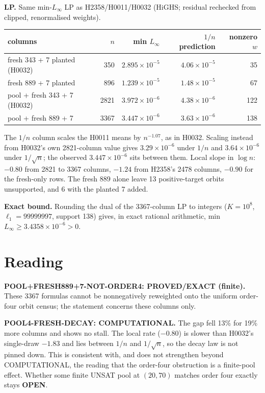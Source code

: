 \documentclass[11pt]{article}
\begin{document}
\textbf{LP.} Same min-$L_\infty$ LP as H2358/H0011/H0032 (HiGHS; residual rechecked from clipped, renormalised weights).
\begin{center}\begin{tabular}{lrrrr}\toprule
columns & $n$ & min $L_\infty$ & $1/n$ prediction & nonzero $w$\\\midrule
fresh 343 + 7 planted (H0032) & 350 & $2.895\times10^{-5}$ & $4.06\times10^{-5}$ & 35\\
fresh 889 + 7 planted & 896 & $1.239\times10^{-5}$ & $1.48\times10^{-5}$ & 67\\
pool + fresh 343 + 7 (H0032) & 2821 & $3.972\times10^{-6}$ & $4.38\times10^{-6}$ & 122\\
pool + fresh 889 + 7 & 3367 & $3.447\times10^{-6}$ & $3.63\times10^{-6}$ & 138\\\bottomrule
\end{tabular}\end{center}
The $1/n$ column scales the H0011 means by $n^{-1.07}$, as in H0032. Scaling instead from H0032's own 2821-column value gives $3.29\times10^{-6}$ under $1/n$ and $3.64\times10^{-6}$ under $1/\sqrt n$; the observed $3.447\times10^{-6}$ sits between them. Local slope in $\log n$: $-0.80$ from 2821 to 3367 columns, $-1.24$ from H2358's 2478 columns, $-0.90$ for the fresh-only rows. The fresh 889 alone leave 13 positive-target orbits unsupported, and 6 with the planted 7 added.

\textbf{Exact bound.} Rounding the dual of the 3367-column LP to integers ($K=10^8$, $\ell_1=99999997$, support 138) gives, in exact rational arithmetic, min $L_\infty\ge3.4358\times10^{-6}>0$.

\section*{Reading}
\textbf{POOL+FRESH889+7-NOT-ORDER4: PROVED/EXACT (finite).} These 3367 formulas cannot be nonnegatively reweighted onto the uniform order-four orbit census; the statement concerns these columns only.

\textbf{POOL4-FRESH-DECAY: COMPUTATIONAL.} The gap fell 13\% for 19\% more columns and shows no stall. The local rate ($-0.80$) is slower than H0032's single-draw $-1.83$ and lies between $1/n$ and $1/\sqrt n$, so the decay law is not pinned down. This is consistent with, and does not strengthen beyond COMPUTATIONAL, the reading that the order-four obstruction is a finite-pool effect. Whether some finite UNSAT pool at $(20,70)$ matches order four exactly stays \textbf{OPEN}.
\end{document}
